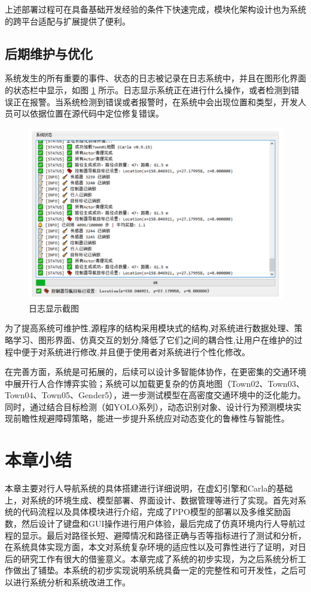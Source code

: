 上述部署过程可在具备基础开发经验的条件下快速完成，模块化架构设计也为系统的跨平台适配与扩展提供了便利。

\subsection{后期维护与优化}

系统发生的所有重要的事件、状态的日志被记录在日志系统中，并且在图形化界面的状态栏中显示，如图 \ref{fig:gui-log} 所示。日志显示系统正在进行什么操作，或者检测到错误正在报警。当系统检测到错误或者报警时，在系统中会出现位置和类型，开发人员可以依据位置在源代码中定位修复错误。

\begin{figure}[H]
    \centering
    \includegraphics[width=1\textwidth]{images/gui_log.pdf}
    \caption{日志显示截图}
    \label{fig:gui-log}
\end{figure}

为了提高系统可维护性,源程序的结构采用模块式的结构,对系统进行数据处理、策略学习、图形界面、仿真交互的划分,降低了它们之间的耦合性,让用户在维护的过程中便于对系统进行修改,并且便于使用者对系统进行个性化修改。

在完善方面，系统是可拓展的，后续可以设计多智能体协作，在更密集的交通环境中展开行人合作博弈实验；系统可以加载更复杂的仿真地图（Town02、Town03、Town04、Town05、Gender5），进一步测试模型在高密度交通环境中的泛化能力。同时，通过结合目标检测（如YOLO系列），动态识别对象、设计行为预测模块实现前瞻性规避障碍策略，能进一步提升系统应对动态变化的鲁棒性与智能性。

\section{本章小结}

本章主要对行人导航系统的具体搭建进行详细说明，在虚幻引擎和Carla的基础上，对系统的环境生成、模型部署、界面设计、数据管理等进行了实现。首先对系统的代码流程以及具体模块进行介绍，完成了PPO模型的部署以及多维奖励函数，然后设计了键盘和GUI操作进行用户体验，最后完成了仿真环境内行人导航过程的显示。最后对路径长短、避障情况和路径正确与否等指标进行了测试和分析，在系统具体实现方面，本文对系统复杂环境的适应性以及可靠性进行了证明，对日后的研究工作有很大的借鉴意义。本章完成了系统的初步实现，为之后系统分析工作做出了铺垫。本系统的初步实现说明系统具备一定的完整性和可开发性，之后可以进行系统分析和系统改进工作。
